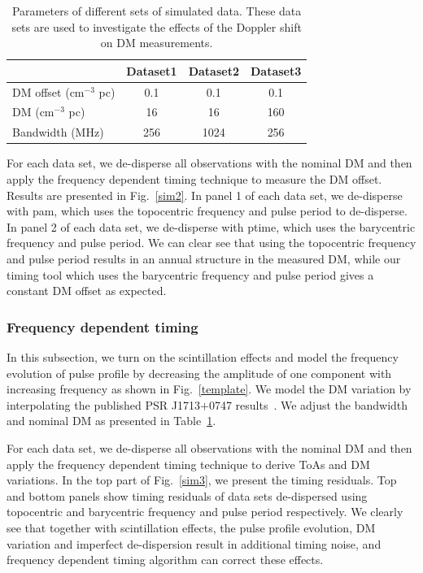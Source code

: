 \documentclass[useAMS,usenatbib]{mn2e}
\begin{document}
\begin{table}
\begin{center}
\caption{Parameters of different sets of simulated data. These data sets are used to
investigate the effects of the Doppler shift on DM measurements.}
\label{simT2}
\begin{tabular}{lccc}
\hline
                           &    Dataset1   &   Dataset2    &   Dataset3    \\
\hline                                                                     
DM offset (cm$^{-3}$ pc)   &     0.1       &   0.1         &   0.1         \\
DM (cm$^{-3}$ pc)          &     16        &   16          &   160         \\
Bandwidth (MHz)            &     256       &   1024        &   256         \\
\hline
\end{tabular}
\end{center}
\end{table}

For each data set, we de-disperse all observations with the nominal DM and then apply the 
frequency dependent timing technique to measure the DM offset.
%
Results are presented in Fig.~\ref{sim2}. In panel 1 of each data set, we de-disperse with 
pam, which uses the topocentric frequency and pulse period to de-disperse. In panel 2 of 
each data set, we de-disperse with ptime, which uses the barycentric frequency and pulse period.
%
We can clear see that using the topocentric frequency and pulse period results in an 
annual structure in the measured DM, while our timing tool which uses the barycentric 
frequency and pulse period gives a constant DM offset as expected.

\subsubsection{Frequency dependent timing}

In this subsection, we turn on the scintillation effects and model the frequency evolution 
of pulse profile by decreasing the amplitude of one component with increasing frequency as 
shown in Fig.~\ref{template}.
%
We model the DM variation by interpolating the published PSR J1713$+$0747 results~\citep{Keith13}.  
We adjust the bandwidth and nominal DM as presented in Table~\ref{simT2}.

For each data set, we de-disperse all observations with the nominal DM and then apply the 
frequency dependent timing technique to derive ToAs and DM variations.
%
In the top part of Fig.~\ref{sim3}, we present the timing residuals. Top and bottom panels show 
timing residuals of data sets de-dispersed using topocentric and barycentric frequency and pulse 
period respectively.
%
We clearly see that together with scintillation effects, the pulse profile evolution, DM variation 
and imperfect de-dispersion result in additional timing noise, and frequency dependent timing 
algorithm can correct these effects.
%
\end{document}
